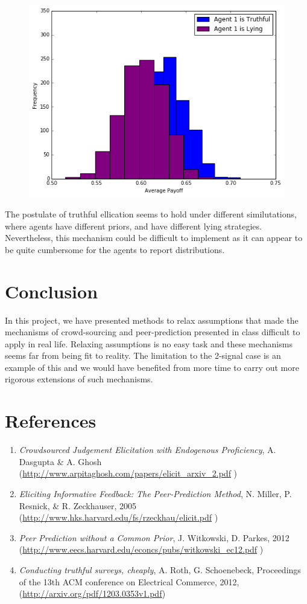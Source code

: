 \documentclass{scrartcl}
\begin{document}
\begin{figure}[H]
\centering
\includegraphics[scale=0.5]{images/3_3}
\end{figure}

The postulate of truthful ellication seems to hold under different similutations, where agents have different priors, and have different lying strategies. Nevertheless, this mechanism could be difficult to implement as it can appear to be quite cumbersome for the agents to report distributions.\\

\section{Conclusion}
In this project, we have presented methods to relax assumptions that made the mechanisms of crowd-sourcing and peer-prediction presented in class difficult to apply in real life. Relaxing assumptions is no easy task and these mechanisms seems far from being fit to reality. The limitation to the 2-signal case is an example of this and we would have benefited from more time to carry out more rigorous extensions of such mechanisms.

\section*{References}
\begin{enumerate}
	\item \emph{Crowdsourced Judgement Elicitation with Endogenous Proficiency}, A. Dasgupta \& A. Ghosh (\url{http://www.arpitaghosh.com/papers/elicit_arxiv_2.pdf} \label{itm:1})
	\item \emph{Eliciting Informative Feedback: The Peer-Prediction Method}, N. Miller, P. Resnick, \& R. Zeckhauser, 2005 (\url{http://www.hks.harvard.edu/fs/rzeckhau/elicit.pdf} \label{itm:2})
	\item \emph{Peer Prediction without a Common Prior}, J. Witkowski, D. Parkes, 2012 $\quad$
	(\url{http://www.eecs.harvard.edu/econcs/pubs/witkowski_ec12.pdf} \label{itm:3})
	\item \emph{Conducting truthful surveys, cheaply}, A. Roth, G. Schoenebeck, Proceedings of the 13th ACM conference on Electrical Commerce, 2012, \quad (\url{http://arxiv.org/pdf/1203.0353v1.pdf})
\end{enumerate}
\end{document}
